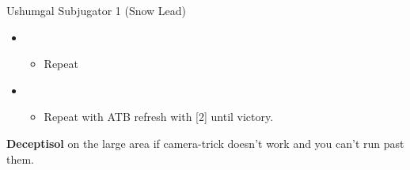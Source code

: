 \begin{multicols}{2}
\begin{battle}{Ushumgal Subjugator 1 (Snow Lead)}
\begin{itemize}
\begin{itemize}
              \item Potion, use when Ushumgal Subjugator uses Tail Hammer
              \item Repeat
              \item \stagger
            \end{itemize}
      \item \sixth
            \begin{itemize}
              \item Repeat
            \end{itemize}
      \item \first
            \begin{itemize}
              \item Repeat with ATB refresh with [2] until victory.
            \end{itemize}
    \end{itemize}
  \end{battle}
  \textbf{Deceptisol} on the large area if camera-trick doesn't work and you can't run past them.

  \vfill
\end{multicols}
\renewcommand{\first}{[1] Ravager (\rav)}
\renewcommand{\second}{[2] Medic (\med)}
\renewcommand{\third}{[3] Synergist (\syn)}
\newpage
